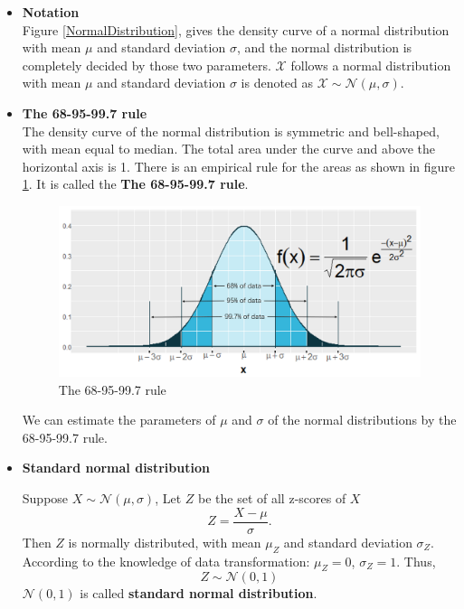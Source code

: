 \documentclass[a4paper, 12pt,twoside]{book}
\begin{document}
\begin{itemize}
\item \textbf{Notation}\vspace{0.3cm}\\
Figure \ref{NormalDistribution}, gives the density curve of a normal distribution with mean $\mu$ and standard deviation $\sigma$, and the normal distribution is completely decided by those two parameters. $\mathcal{X}$ follows a normal distribution with mean $\mu$ and standard deviation $\sigma$ is denoted as $\mathcal{X}\sim \mathcal{N}(\mu, \sigma)$.
\vspace{0.6cm}

\item \textbf{The 68-95-99.7 rule}\vspace{0.3cm}\\
The density curve of the normal distribution is symmetric and bell-shaped, with mean equal to median. The total area under the curve and above the horizontal axis is 1. There is an empirical rule for the areas as shown in figure \ref{68-95-99.7Rule}. It is called the \textbf{The 68-95-99.7 rule}.

\begin{figure}[H]
\centering
\includegraphics[scale=0.35]{68-95-997Rule.png}
\caption{The 68-95-99.7 rule}
\label{68-95-99.7Rule}
\end{figure}
\colorbox{babypink}{\parbox{\textwidth}{We can estimate the parameters of $\mu$ and $\sigma$ of the normal distributions by the 68-95-99.7 rule.}}

\item \textbf{Standard normal distribution}
\vspace{0.6cm}

Suppose $X \sim \mathcal{N}(\mu, \sigma)$, Let $Z$ be the set of all z-scores of $X$
$$Z=\frac{X - \mu}{\sigma}. $$
Then $Z$ is normally distributed, with mean $\mu_Z$ and standard deviation $\sigma_Z$. According to the knowledge of data transformation: $\mu_Z = 0$, $\sigma_Z = 1$. Thus, $$Z \sim \mathcal{N}(0, 1)$$
$\mathcal{N}(0, 1)$ is called \textbf{standard normal distribution}.
\vspace{0.6cm}


\end{itemize}
\end{document}

